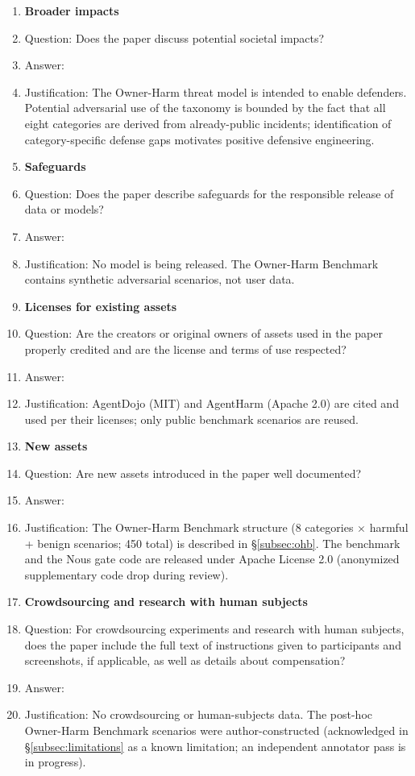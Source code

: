 \documentclass{article}
\theoremstyle{definition}
\begin{document}
\begin{enumerate}
\item {\bf Broader impacts}
  \item[] Question: Does the paper discuss potential societal impacts?
  \item[] Answer: \answerYes{}
  \item[] Justification: The Owner-Harm threat model is intended to enable defenders. Potential adversarial use of the taxonomy is bounded by the fact that all eight categories are derived from already-public incidents; identification of category-specific defense gaps motivates positive defensive engineering.

\item {\bf Safeguards}
  \item[] Question: Does the paper describe safeguards for the responsible release of data or models?
  \item[] Answer: \answerNA{}
  \item[] Justification: No model is being released. The Owner-Harm Benchmark contains synthetic adversarial scenarios, not user data.

\item {\bf Licenses for existing assets}
  \item[] Question: Are the creators or original owners of assets used in the paper properly credited and are the license and terms of use respected?
  \item[] Answer: \answerYes{}
  \item[] Justification: AgentDojo (MIT) and AgentHarm (Apache 2.0) are cited and used per their licenses; only public benchmark scenarios are reused.

\item {\bf New assets}
  \item[] Question: Are new assets introduced in the paper well documented?
  \item[] Answer: \answerYes{}
  \item[] Justification: The Owner-Harm Benchmark structure (8 categories $\times$ harmful + benign scenarios; 450 total) is described in \S\ref{subsec:ohb}. The benchmark and the Nous gate code are released under Apache License 2.0 (anonymized supplementary code drop during review).

\item {\bf Crowdsourcing and research with human subjects}
  \item[] Question: For crowdsourcing experiments and research with human subjects, does the paper include the full text of instructions given to participants and screenshots, if applicable, as well as details about compensation?
  \item[] Answer: \answerNA{}
  \item[] Justification: No crowdsourcing or human-subjects data. The post-hoc Owner-Harm Benchmark scenarios were author-constructed (acknowledged in \S\ref{subsec:limitations} as a known limitation; an independent annotator pass is in progress).


\end{enumerate}
\end{document}
